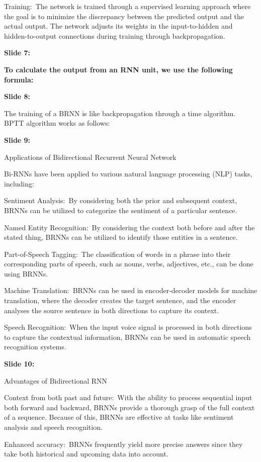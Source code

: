 \documentclass[11pt,a4paper]{article}
\begin{document}
Training: The network is trained through a supervised learning approach where the goal is to minimize the discrepancy between the predicted output and the actual output. The network adjusts its weights in the input-to-hidden and hidden-to-output connections during training through backpropagation.

\textbf{Slide 7:}

\textbf{To calculate the output from an RNN unit, we use the following formula:} 

\textbf{Slide 8:}

The training of a BRNN is like backpropagation through a time algorithm. BPTT algorithm works as follows:

\textbf{Slide 9:}

Applications of Bidirectional Recurrent Neural Network

Bi-RNNs have been applied to various natural language processing (NLP) tasks, including:

Sentiment Analysis: By considering both the prior and subsequent context, BRNNs can be utilized to categorize the sentiment of a particular sentence.

Named Entity Recognition: By considering the context both before and after the stated thing, BRNNs can be utilized to identify those entities in a sentence.

Part-of-Speech Tagging: The classification of words in a phrase into their corresponding parts of speech, such as nouns, verbs, adjectives, etc., can be done using BRNNs.

Machine Translation: BRNNs can be used in encoder-decoder models for machine translation, where the decoder creates the target sentence, and the encoder analyses the source sentence in both directions to capture its context.

Speech Recognition: When the input voice signal is processed in both directions to capture the contextual information, BRNNs can be used in automatic speech recognition systems.

\textbf{Slide 10:}

Advantages of Bidirectional RNN

Context from both past and future: With the ability to process sequential input both forward and backward, BRNNs provide a thorough grasp of the full context of a sequence. Because of this, BRNNs are effective at tasks like sentiment analysis and speech recognition.

Enhanced accuracy: BRNNs frequently yield more precise answers since they take both historical and upcoming data into account.
\end{document}

